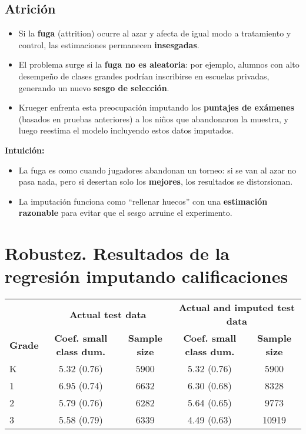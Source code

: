 \documentclass[12pt]{article}
\begin{document}
\subsection*{\noindent\textbf{Atrición}}

\begin{itemize}
    \item Si la \textbf{fuga} (attrition) ocurre al azar y afecta de igual modo a tratamiento y control, las estimaciones permanecen \textbf{insesgadas}.
    \item El problema surge si la \textbf{fuga no es aleatoria}: por ejemplo, alumnos con alto desempeño de clases grandes podrían inscribirse en escuelas privadas, generando un nuevo \textbf{sesgo de selección}.
    \item Krueger enfrenta esta preocupación imputando los \textbf{puntajes de exámenes} (basados en pruebas anteriores) a los niños que abandonaron la muestra, y luego reestima el modelo incluyendo estos datos imputados.
\end{itemize}

\textbf{Intuición:}
\begin{itemize}
    \item La fuga es como cuando jugadores abandonan un torneo: si se van al azar no pasa nada, pero si desertan solo los \textbf{mejores}, los resultados se distorsionan.
    \item La imputación funciona como “rellenar huecos” con una \textbf{estimación razonable} para evitar que el sesgo arruine el experimento.
\end{itemize}

\section*{\noindent\textbf{Robustez. Resultados de la regresión imputando calificaciones}}

\begin{table}[H]
\centering
\begin{tabular}{lcccc}
 & \multicolumn{2}{c}{\textbf{Actual test data}} & \multicolumn{2}{c}{\textbf{Actual and imputed test data}} \\
\textbf{Grade} & \textbf{Coef. small class dum.} & \textbf{Sample size} & \textbf{Coef. small class dum.} & \textbf{Sample size} \\
\hline
K & 5.32 (0.76) & 5900 & 5.32 (0.76) & 5900 \\
1 & 6.95 (0.74) & 6632 & 6.30 (0.68) & 8328 \\
2 & 5.79 (0.76) & 6282 & 5.64 (0.65) & 9773 \\
3 & 5.58 (0.79) & 6339 & 4.49 (0.63) & 10919 \\
\end{tabular}
\end{table}
\end{document}
